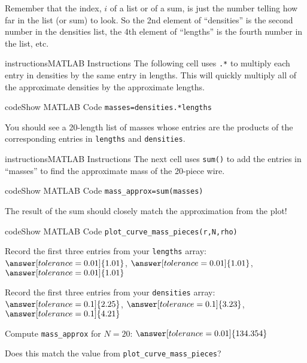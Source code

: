 \documentclass{ximera}
\begin{document}
\begin{remark}
Remember that the index, $i$ of a list or of a sum, is just the number telling how far in the list (or sum) to look. So the 2nd element of ``densities'' is the second number in the densities list, the 4th element of ``lengths'' is the fourth number in the list, etc.
\end{remark}

\begin{expandable}{instructions}{MATLAB Instructions}
The following cell uses \texttt{.*} to multiply each entry in densities by the same entry in lengths. This will quickly multiply all of the approximate densities by the approximate lengths.
\end{expandable}

\begin{expandable}{code}{Show MATLAB Code}
\texttt{masses=densities.*lengths}
\end{expandable}

You should see a 20-length list of masses whose entries are the products of the corresponding entries in \texttt{lengths} and \texttt{densities}.

\begin{expandable}{instructions}{MATLAB Instructions}
The next cell uses \texttt{sum()} to add the entries in ``masses'' to find the approximate mass of the 20-piece wire.
\end{expandable}

\begin{expandable}{code}{Show MATLAB Code}
\texttt{mass\_approx=sum(masses)}
\end{expandable}

The result of the sum should closely match the approximation from the plot!

\begin{expandable}{code}{Show MATLAB Code}
\texttt{plot\_curve\_mass\_pieces(r,N,rho)}
\end{expandable}

\begin{problem}
Record the first three entries from your \texttt{lengths} array: $\answer[tolerance=0.01]{1.01}$, $\answer[tolerance=0.01]{1.01}$, $\answer[tolerance=0.01]{1.01}$

Record the first three entries from your \texttt{densities} array: $\answer[tolerance=0.1]{2.25}$, $\answer[tolerance=0.1]{3.23}$, $\answer[tolerance=0.1]{4.21}$

Compute \texttt{mass\_approx} for $N=20$: $\answer[tolerance=0.01]{134.354}$

Does this match the value from \texttt{plot\_curve\_mass\_pieces}? 
\end{problem}
\end{document}
